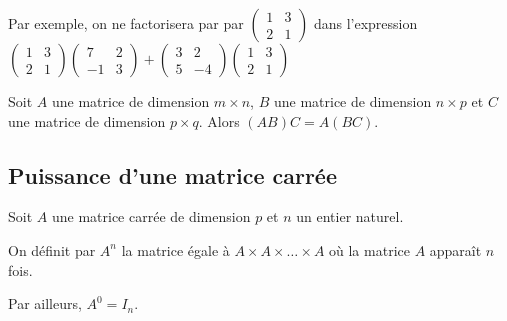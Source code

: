 \documentclass[11pt,fleqn]{book} %
\begin{document}
Par exemple, on ne factorisera par par $\begin{pmatrix}
1 & 3 \\ 2 & 1
\end{pmatrix}$ dans l'expression $\begin{pmatrix}
1 & 3 \\ 2 & 1
\end{pmatrix} \begin{pmatrix} 7 & 2 \\ -1 & 3\end{pmatrix} + \begin{pmatrix}3 & 2 \\ 5 & -4\end{pmatrix}\begin{pmatrix}
1 & 3 \\ 2 & 1
\end{pmatrix}$

\begin{proposition}Soit $A$ une matrice de dimension $m \times n$, $B$ une matrice de dimension $n \times p$ et $C$ une matrice de dimension $p \times q$. Alors $(AB)C = A(BC)$.\end{proposition}

\subsection{Puissance d'une matrice carrée}

\begin{definition}Soit $A$ une matrice carrée de dimension $p$ et $n$ un entier naturel.

On définit par $A^n$ la matrice égale à $A \times A \times \dots \times A$ où la matrice $A$ apparaît $n$ fois.

Par ailleurs, $A^0 = I_n$.\end{definition}
\end{document}

